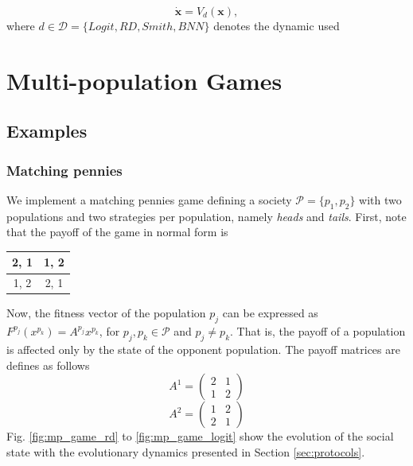 \documentclass[a4paper,10pt]{article}
\newcommand{\bs}[1]{\boldsymbol{#1}}
\newcommand{\pop}{\mathcal{P}}
\begin{document}
\begin{equation}
\dot{ \bs{x} } = V_d( \bs{x} ),
\end{equation}
where $d\in \mathcal{D}=\{ Logit, RD, Smith, BNN \}$ denotes the dynamic used







\newpage

\section{Multi-population Games}



\subsection{Examples}

\subsubsection{Matching pennies}

We implement a matching pennies game defining a society $\pop = \{p_1, p_2\}$ with two populations and two strategies per population, namely \emph{heads} and \emph{tails}. First, note that the payoff of the game in normal form is
%
\begin{table}[h]
\centering
 \begin{tabular}{|c|c|} \hline
  2, 1 & 1, 2 \\ \hline
  1, 2 & 2, 1 \\ \hline
 \end{tabular}
\end{table}
%
Now, the fitness vector of the  population $p_j$ can be expressed as $F^{p_j}(x^{p_k}) = A^{p_j} x^{p_k}$, for $p_j, p_k \in \pop$ and $p_j \neq p_k$. That is, the payoff of a population is affected only by the state of the opponent population.
The payoff matrices are defines as follows
%
\begin{equation}
  A^1 = \begin{pmatrix}
2 & 1 \\
1 & 2 
  \end{pmatrix}
\end{equation}
%
\begin{equation}
  A^2 = \begin{pmatrix}
  1 & 2 \\
  2 & 1 
  \end{pmatrix}
\end{equation}
%
Fig. \ref{fig:mp_game_rd} to \ref{fig:mp_game_logit} show the evolution of the social state with the evolutionary dynamics presented in Section \ref{sec:protocols}. 
\end{document}
